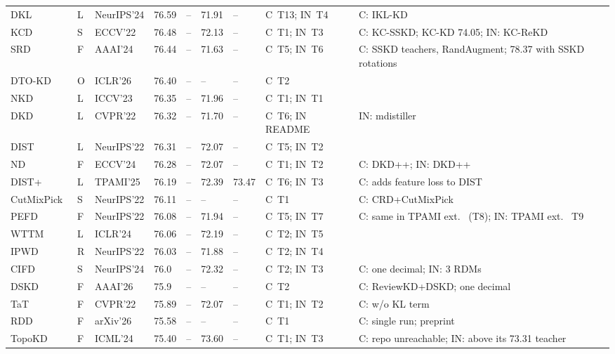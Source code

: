 {\begin{longtable}{@{}lllllll>{\raggedright\arraybackslash}p{1.5cm}>{\raggedright\arraybackslash}p{3.8cm}@{}}
DKL~\citep{cui2024dkl} & L & NeurIPS'24 & 76.59 & -- & 71.91 & -- & C~T13; IN~T4 & C: IKL-KD \\
KCD~\citep{li2022kcd} & S & ECCV'22 & 76.48 & -- & 72.13 & -- & C~T1; IN~T3 & C: KC-SSKD; KC-KD 74.05; IN: KC-ReKD \\
SRD~\citep{miles2024projector} & F & AAAI'24 & 76.44 & -- & 71.63 & -- & C~T5; IN~T6 & C: SSKD teachers, RandAugment; 78.37 with SSKD rotations \\
DTO-KD~\citep{hayder2026dtokd} & O & ICLR'26 & 76.40 & -- & -- & -- & C~T2 &  \\
NKD~\citep{yang2023nkd} & L & ICCV'23 & 76.35 & -- & 71.96 & -- & C~T1; IN~T1 &  \\
DKD~\citep{zhao2022dkd} & L & CVPR'22 & 76.32 & -- & 71.70 & -- & C~T6; IN README & IN: mdistiller \\
DIST~\citep{huang2022dist} & L & NeurIPS'22 & 76.31 & -- & 72.07 & -- & C~T5; IN~T2 &  \\
ND~\citep{wang2024nd} & F & ECCV'24 & 76.28 & -- & 72.07 & -- & C~T1; IN~T2 & C: DKD++; IN: DKD++ \\
DIST+~\citep{huang2025distplus} & L & TPAMI'25 & 76.19 & -- & 72.39 & 73.47 & C~T6; IN~T3 & C: adds feature loss to DIST \\
CutMixPick~\citep{wang2022cutmixpick} & S & NeurIPS'22 & 76.11 & -- & -- & -- & C~T1 & C: CRD+CutMixPick \\
PEFD~\citep{chen2022pefd} & F & NeurIPS'22 & 76.08 & -- & 71.94 & -- & C~T5; IN~T7 & C: same in TPAMI ext.~\citep{chen2026pefd} (T8); IN: TPAMI ext.~\citep{chen2026pefd} T9 \\
WTTM~\citep{zheng2024wttm} & L & ICLR'24 & 76.06 & -- & 72.19 & -- & C~T2; IN~T5 &  \\
IPWD~\citep{niu2022ipwd} & R & NeurIPS'22 & 76.03 & -- & 71.88 & -- & C~T2; IN~T4 &  \\
CIFD~\citep{saidutta2024cifd} & S & NeurIPS'24 & 76.0 & -- & 72.32 & -- & C~T2; IN~T3 & C: one decimal; IN: 3 RDMs \\
DSKD~\citep{liao2026dskd} & F & AAAI'26 & 75.9 & -- & -- & -- & C~T2 & C: ReviewKD+DSKD; one decimal \\
TaT~\citep{lin2022tat} & F & CVPR'22 & 75.89 & -- & 72.07 & -- & C~T1; IN~T2 & C: w/o KL term \\
RDD~\citep{mugisha2026rdd} & F & arXiv'26 & 75.58 & -- & -- & -- & C~T1 & C: single run; preprint \\
TopoKD~\citep{kim2024topkd} & F & ICML'24 & 75.40 & -- & 73.60 & -- & C~T1; IN~T3 & C: repo unreachable; IN: above its 73.31 teacher \\

\end{longtable}}
